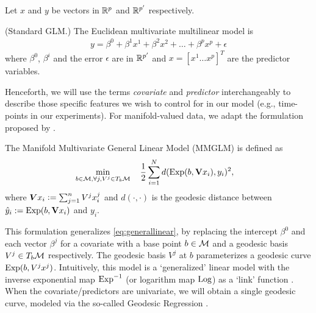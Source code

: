 Let $x$ and $y$ be vectors in $\mathbb{R}^p$ and $\mathbb{R}^{p'}$ respectively.
\begin{definition} (Standard GLM.) The Euclidean multivariate multilinear model is 
{\begin{equation}
	\begin{split}
	y  = \beta^0 + \beta^{1} x^{1} + \beta^{2} x^{2} + \ldots +\beta^{p} x^{p} + \epsilon
	\end{split}
	\label{eq:generallinear}
	\end{equation}}
where $\beta^0$, $\beta^{i}$ and the error $\epsilon$ are in $\mathbb{R}^{p'}$ and $x = [x^1 \ldots x^p ]^{T}$ are the 
predictor variables.
\end{definition}
Henceforth, we will use the terms \textit{covariate} and \textit{predictor} interchangeably to describe those specific features we wish to control for in our model (e.g., time-points in our experiments).
For manifold-valued data, we adapt the formulation proposed by \cite{hjkimcvpr2014}.
\begin{definition} The Manifold Multivariate General Linear Model (MMGLM) is defined as 
{\begin{equation}
	\begin{split}
	&\min_{b \in \Mc, \forall j, V^j \in T_{b}\Mc} \quad \frac{1}{2} %
	\sum_{i=1}^{N}d(\EXP(b, \textbf{V} x_i),y_i)^2,
	\end{split}
	\label{eq:multigr}
	\end{equation}}
where $\bm{V} x_i \mathrel{\mathop:}= \sum_{j=1}^{n}V^j x_{i}^{j}$ and $d(\cdot, \cdot)$ is the geodesic distance between $\hat{y}_i:=\text{Exp}(b, \textbf{V} x_i)$ and $y_i$. 
\end{definition}
This formulation generalizes \eqref{eq:generallinear}, by replacing the intercept $\beta^0$ and each vector $\beta^j$ for a covariate with a 
base point $b \in \mathcal{M}$ and a geodesic basis $V^j \in T_{b}\mathcal{M}$ respectively. The geodesic basis $V^j$ at $b$ parameterizes a geodesic curve $\text{Exp}(b,V^jx^j)$.
Intuitively, this model is a `generalized' linear model with the inverse exponential map $\text{Exp}^{-1}$ (or logarithm map $\text{Log}$) as a 
`link' function \cite{hjkimcvpr2014,cornea2016regression}. When the covariate/predictors are univariate, we will obtain a single geodesic curve, modeled via 
the so-called Geodesic Regression \cite{fletcher2013geodesic}.

